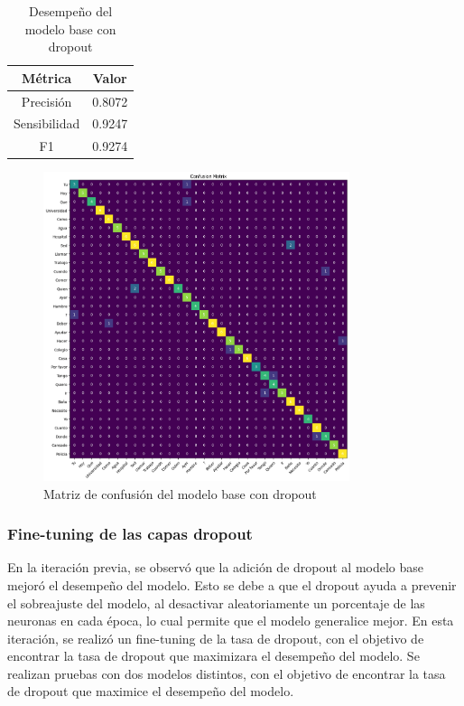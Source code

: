 \begin{table}[H]
    \centering
    \begin{tabular}{|c|c|}
        \hline
        \textbf{Métrica} & \textbf{Valor} \\
        \hline
        Precisión & 0.8072 \\
        \hline
        Sensibilidad & 0.9247 \\
        \hline
        F1 & 0.9274 \\
        \hline
    \end{tabular}
    \caption{Desempeño del modelo base con dropout}
    \label{tab:DesempeñoModeloBaseDropout}
\end{table}

\begin{figure}[H]
    \centering
    \includegraphics[width=0.8\textwidth]{figuras/modelDropoutCM.png}
    \caption{Matriz de confusión del modelo base con dropout}
    \label{fig:CMModeloBaseDropout}
\end{figure}

\subsubsection{Fine-tuning de las capas dropout}
En la iteración previa, se observó que la adición de dropout al modelo base mejoró el desempeño del modelo.
Esto se debe a que el dropout ayuda a prevenir el sobreajuste del modelo, al desactivar aleatoriamente un porcentaje de las neuronas en cada época, lo cual permite que el modelo generalice mejor.
En esta iteración, se realizó un fine-tuning de la tasa de dropout, con el objetivo de encontrar la tasa de dropout que maximizara el desempeño del modelo.
Se realizan pruebas con dos modelos distintos, con el objetivo de encontrar la tasa de dropout que maximice el desempeño del modelo.

